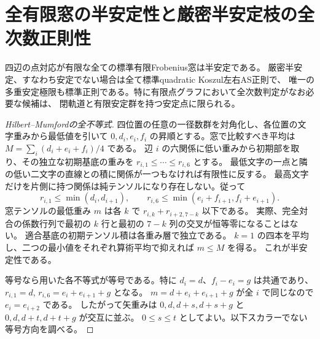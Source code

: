 \section{全有限窓の半安定性と厳密半安定枝の全次数正則性}
\label{sec:finite-window-semistability}
\begin{theorem}\label{thm:all-finite-windows-semistable}
四辺の点対応が有限な全ての標準有限Frobenius窓は半安定である。
厳密半安定、すなわち安定でない場合は全て標準quadratic Koszul左右AS正則で、
唯一の多重安定極限も標準正則である。特に有限点グラフにおいて全次数判定がなお必要な候補は、
閉軌道と有限安定群を持つ安定点に限られる。
\end{theorem}

\begin{proof}[Hilbert--Mumfordの全不等式]
四位置の任意の一径数群を対角化し、各位置の文字重みから最低値を引いて
$0,d_i,e_i,f_i$ の昇順とする。窓で比較すべき平均は $M=\sum_i(d_i+e_i+f_i)/4$ である。
辺 $i$ の六関係に低い重みから初期部を取り、その独立な初期基底の重みを
$r_{i,1}\le\cdots\le r_{i,6}$ とする。
最低文字の一点と隣の低い二文字の直線との積に関係が一つもなければ有限性に反する。
最高文字だけを片側に持つ関係は純テンソルになり存在しない。従って
\[
 r_{i,1}\le\min(d_i,d_{i+1}),\qquad
 r_{i,6}\le\min(e_i+f_{i+1},f_i+e_{i+1}).
\]
窓テンソルの最低重み $m$ は各 $k$ で $r_{i,k}+r_{i+2,7-k}$ 以下である。
実際、完全対合の係数行列で最初の $k$ 行と最初の $7-k$ 列の交叉が恒等零になることはない。
適合基底の初期テンソル積は各重み層で独立である。
$k=1$ の四本を平均し、二つの最小値をそれぞれ算術平均で抑えれば $m\le M$ を得る。
これが半安定性である。

等号なら用いた各不等式が等号である。特に $d_i=d$、$f_i-e_i=g$ は共通であり、
$r_{i,1}=d$, $r_{i,6}=e_i+e_{i+1}+g$ となる。
$m=d+e_i+e_{i+1}+g$ が全 $i$ で同じなので $e_i=e_{i+2}$ である。
したがって矢重みは $0,d,d+s,d+s+g$ と $0,d,d+t,d+t+g$ が交互に並ぶ。
$0\le s\le t$ としてよい。以下スカラーでない等号方向を調べる。
\end{proof}

